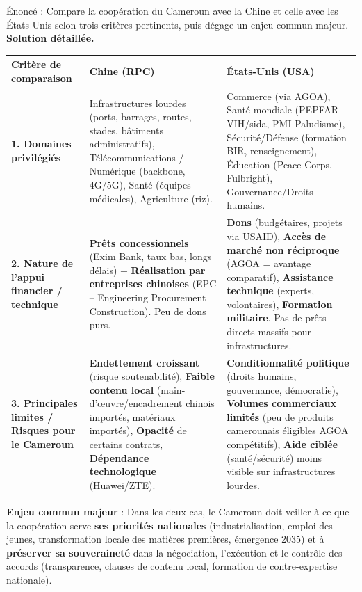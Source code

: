 \documentclass[11pt]{article}
\newcommand{\cle}[1]{{\popxbold\color{popdark}#1}}
\begin{document}
\begin{exoresolu}
Énoncé : Compare la coopération du Cameroun avec la Chine et celle avec les États-Unis selon trois critères pertinents, puis dégage un enjeu commun majeur.
\tcblower
\textbf{Solution détaillée.}
\begin{center}
\begin{tabularx}{\linewidth}{|l|X|X|}
\hline
\rowcolor{popblueL} \textbf{Critère de comparaison} & \textbf{Chine (RPC)} & \textbf{États-Unis (USA)} \\
\hline
\textbf{1. Domaines privilégiés} & Infrastructures lourdes (ports, barrages, routes, stades, bâtiments administratifs), Télécommunications / Numérique (backbone, 4G/5G), Santé (équipes médicales), Agriculture (riz). & Commerce (via \cle{AGOA}), Santé mondiale (\cle{PEPFAR} VIH/sida, \cle{PMI} Paludisme), Sécurité/Défense (formation BIR, renseignement), Éducation (Peace Corps, Fulbright), Gouvernance/Droits humains. \\
\hline
\textbf{2. Nature de l'appui financier / technique} & \textbf{Prêts concessionnels} (Exim Bank, taux bas, longs délais) + \textbf{Réalisation par entreprises chinoises} (EPC -- Engineering Procurement Construction). Peu de dons purs. & \textbf{Dons} (budgétaires, projets via USAID), \textbf{Accès de marché non réciproque} (AGOA = avantage comparatif), \textbf{Assistance technique} (experts, volontaires), \textbf{Formation militaire}. Pas de prêts directs massifs pour infrastructures. \\
\hline
\textbf{3. Principales limites / Risques pour le Cameroun} & \textbf{Endettement croissant} (risque soutenabilité), \textbf{Faible contenu local} (main-d'œuvre/encadrement chinois importés, matériaux importés), \textbf{Opacité} de certains contrats, \textbf{Dépendance technologique} (Huawei/ZTE). & \textbf{Conditionnalité politique} (droits humains, gouvernance, démocratie), \textbf{Volumes commerciaux limités} (peu de produits camerounais éligibles AGOA compétitifs), \textbf{Aide ciblée} (santé/sécurité) moins visible sur infrastructures lourdes. \\
\hline
\end{tabularx}
\end{center}

\textbf{Enjeu commun majeur} : Dans les deux cas, le Cameroun doit veiller à ce que la coopération serve \textbf{ses priorités nationales} (industrialisation, emploi des jeunes, transformation locale des matières premières, émergence 2035) et à \textbf{préserver sa souveraineté} dans la négociation, l'exécution et le contrôle des accords (transparence, clauses de contenu local, formation de contre-expertise nationale).


\end{exoresolu}
\end{document}
